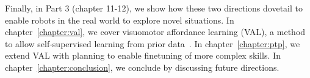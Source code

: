 Finally, in Part 3 (chapter 11-12), we show how these two directions dovetail to enable robots in the real world to explore novel situations. In chapter~\ref{chapter:val}, we cover visuomotor affordance learning (VAL), a method to allow self-supervised learning from prior data~\citep{Khazatsky2021WhatCI}. In chapter~\ref{chapter:ptp}, we extend VAL with planning to enable finetuning of more complex skills. In chapter~\ref{chapter:conclusion}, we conclude by discussing future directions.
